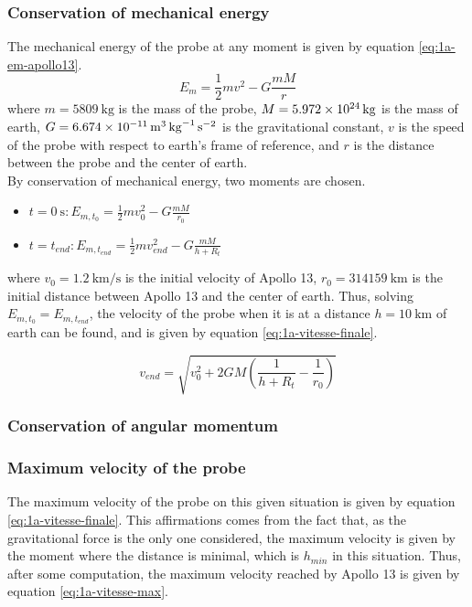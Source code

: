 \documentclass[a4paper,12pt,twoside]{article}
\begin{document}
\subsubsection{Conservation of mechanical energy}
The mechanical energy of the probe at any moment is given by equation \eqref{eq:1a-em-apollo13}.
\begin{equation}
  E_m = \frac{1}{2}mv^2 - G\frac{mM}{r}
  \label{eq:1a-em-apollo13}
\end{equation}
where $m=\SI{5809}{\kilo\gram}$ is the mass of the probe, $M=\SI{5.972d24}{\kilo\gram}$ is the mass of earth, $G=\SI{6.674d-11}{\cubic\meter\per\kilo\gram\per\square\second}$ is the gravitational constant, $v$ is the speed of the probe with respect to earth's frame of reference, and $r$ is the distance between the probe and the center of earth.\\

By conservation of mechanical energy, two moments are chosen.
\begin{itemize}
  \item $t=\SI{0}{\s}: E_{m,t_0} = \frac{1}{2}mv_0^2 - G\frac{mM}{r_0}$
  \item $t=t_{end}: E_{m,t_{end}} = \frac{1}{2}mv_{end}^2 - G\frac{mM}{h + R_t}$
\end{itemize}
where $v_0 = \SI{1.2}{\kilo\meter\per\second}$ is the initial velocity of Apollo 13, $r_0 = \SI{314159}{\kilo\meter}$ is the initial distance between Apollo 13 and the center of earth.
Thus, solving $E_{m,t_0} = E_{m,t_{end}}$, the velocity of the probe when it is at a distance $h=\SI{10}{\kilo\meter}$ of earth can be found, and is given by equation \eqref{eq:1a-vitesse-finale}.

\begin{equation}
  v_{end} = \sqrt{v_0^2 + 2GM\left(\frac{1}{h + R_t} - \frac{1}{r_0}\right)}
  \label{eq:1a-vitesse-finale}
\end{equation}

\subsubsection{Conservation of angular momentum}

\subsubsection{Maximum velocity of the probe}
The maximum velocity of the probe on this given situation is given by equation \eqref{eq:1a-vitesse-finale}.
This affirmations comes from the fact that, as the gravitational force is the only one considered, the maximum velocity is given by the moment where the distance is minimal, which is $h_{min}$ in this situation.
Thus, after some computation, the maximum velocity reached by Apollo 13 is given by equation \eqref{eq:1a-vitesse-max}.
\end{document}
